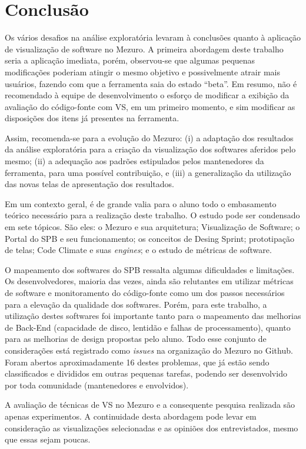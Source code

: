 \chapter[Conclusão]{Conclusão}\label{chap:conclusao}

Os vários desafios na análise exploratória levaram à conclusões quanto à
aplicação de visualização de software no Mezuro. A primeira abordagem deste
trabalho seria a aplicação imediata, porém, observou-se que algumas pequenas
modificações poderiam atingir o mesmo objetivo e possivelmente atrair mais
usuários, fazendo com que a ferramenta saia do estado ``beta''. Em resumo, não
é recomendado à equipe de desenvolvimento o esforço de modificar a exibição da
avaliação do código-fonte com VS, em um primeiro momento, e sim modificar as
disposições dos itens já presentes na ferramenta.

Assim, recomenda-se para a evolução do Mezuro: (i) a adaptação dos resultados da
análise exploratória para a criação da visualização dos softwares aferidos pelo
mesmo; (ii) a adequação aos padrões estipulados pelos mantenedores da
ferramenta, para uma possível contribuição, e (iii) a generalização da
utilização das novas telas de apresentação dos resultados.

Em um contexto geral, é de grande valia para o aluno todo o embasamento teórico
necessário para a realização deste trabalho. O estudo pode ser condensado em sete
tópicos. São eles: o Mezuro e sua arquitetura; Visualização de Software; o
Portal do SPB e seu funcionamento; os conceitos de Desing Sprint; prototipação
de telas; Code Climate e suas \textit{engines}; e o estudo de métricas de
software.

O mapeamento dos softwares do SPB ressalta algumas dificuldades e limitações.
Os desenvolvedores, maioria das vezes, ainda são relutantes em utilizar métricas
de software e monitoramento do código-fonte como um dos passos necessários para
a elevação da qualidade dos softwares. Porém, para este trabalho, a utilização
destes softwares foi importante tanto para o mapeamento das melhorias de
Back-End (capacidade de disco, lentidão e falhas de processamento), quanto para
as melhorias de design propostas pelo aluno. Todo esse conjunto de considerações
está registrado como \textit{issues} na organização do Mezuro no Github. Foram
abertos aproximadamente 16 destes problemas, que já estão sendo classificados
e divididos em outras pequenas tarefas, podendo ser desenvolvido por toda
comunidade (mantenedores e envolvidos).

A avaliação de técnicas de VS no Mezuro e a consequente pesquisa realizada são
apenas experimentos. A continuidade desta abordagem pode levar em consideração
as visualizações selecionadas e as opiniões dos entrevistados, mesmo que essas
sejam poucas.
